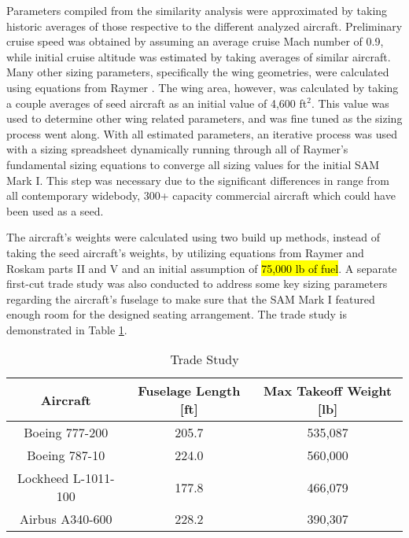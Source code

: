 Parameters compiled from the similarity analysis were approximated by taking historic averages of those respective to the different analyzed aircraft. Preliminary cruise speed was obtained by assuming an average cruise Mach number of 0.9, while initial cruise altitude was estimated by taking averages of similar aircraft. Many other sizing parameters, specifically the wing geometries, were calculated using equations from Raymer \cite{raymer}. The wing area, however, was calculated by taking a couple averages of seed aircraft as an initial value of 4,600 ft$^2$. This value was used to determine other wing related parameters, and was fine tuned as the sizing process went along. With all estimated parameters, an iterative process was used with a sizing spreadsheet dynamically running through all of Raymer's \cite{raymer} fundamental sizing equations to converge all sizing values for the initial SAM Mark I. This step was necessary due to the significant differences in range from all contemporary widebody, 300+ capacity commercial aircraft which could have been used as a seed.

\clearpage
The aircraft's weights were calculated using two build up methods, instead of taking the seed aircraft's weights, by utilizing equations from Raymer \cite{raymer} and Roskam parts II \cite{roskam_2} and V \cite{roskam_5} and an initial assumption of \hl{75,000 lb of fuel}. A separate first-cut trade study was also conducted to address some key sizing parameters regarding the aircraft's fuselage to make sure that the SAM Mark I featured enough room for the designed seating arrangement. The trade study is demonstrated in Table \ref{tab:trade_params}.

\begin{table}[!h] 
    \centering
    \caption{Trade Study}
    \begin{tabular}{ |c||c||c| }\toprule
    \textbf{Aircraft} & \textbf{Fuselage Length [ft]} & \textbf{Max Takeoff Weight [lb]} \\\hline\hline
    Boeing 777-200 & 205.7 & 535,087  \\\hline
    Boeing 787-10 & 224.0 & 560,000  \\\hline
    Lockheed L-1011-100 & 177.8 & 466,079  \\\hline
    Airbus A340-600 & 228.2 & 390,307  \\\hline

    \end{tabular}\label{tab:trade_params}
\end{table}

